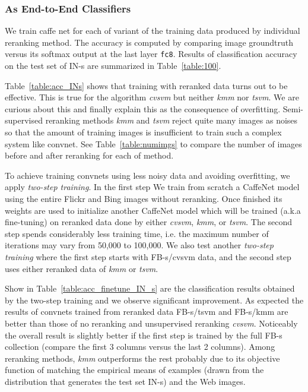 \documentclass[preprint,12pt]{elsarticle}
\begin{document}
\subsubsection{As End-to-End Classifiers}\label{sec:convcls}
\noindent We train caffe net for each of variant of the training data produced by individual reranking method. The accuracy is computed by comparing image groundtruth versus its softmax output at the last layer \texttt{fc8}. Results of classification accuracy on the test set of IN-s are summarized in Table~\ref{table:100}.  

Table~\ref{table:acc_INs} shows that training with reranked data turns out to be effective. This is true for the algorithm \emph{cvsvm} but neither \emph{kmm} nor \emph{tsvm}. We are curious about this and finally explain this as the consequence of overfitting. Semi-supervised reranking methods \emph{kmm} and \emph{tsvm} reject quite many images as noises so that the amount of training images is insufficient to train such a complex system like convnet. See Table~\ref{table:numimgs} to compare the number of images before and after reranking for each of method.
 
To achieve training convnets using less noisy data and avoiding overfitting, we apply \emph{two-step training}. In the first step We train from scratch a CaffeNet model using the entire Flickr and Bing images without reranking. Once finished its weights are used to initialize another CaffeNet model which will be trained (a.k.a fine-tuning) on  reranked data done by either \emph{cvsvm}, \emph{kmm}, or \emph{tsvm}. The second step spends considerably less training time, i.e. the maximum number of iterations may vary from 50,000 to 100,000. We also test another  \emph{two-step training} where the first step starts with FB-s/cvsvm data, and the second step uses either reranked data of \emph{kmm} or \emph{tsvm}.
 
Show in Table~\ref{table:acc_finetune_IN_s} are the classification results obtained by the two-step training and we observe significant improvement. As expected the results of convnets trained from reranked data FB-s/tsvm and FB-s/kmm are better than those of no reranking and unsupervised reranking \emph{cvsvm}. Noticeably the overall result is slightly better if the first step is trained by the full FB-s collection (compare the first 3 columns versus the last 2 columns). Among reranking methods, \emph{kmm} outperforms the rest probably due to its objective function of matching the empirical means of examples (drawn from the distribution that generates the test set IN-s) and the Web images.
 
\end{document}

